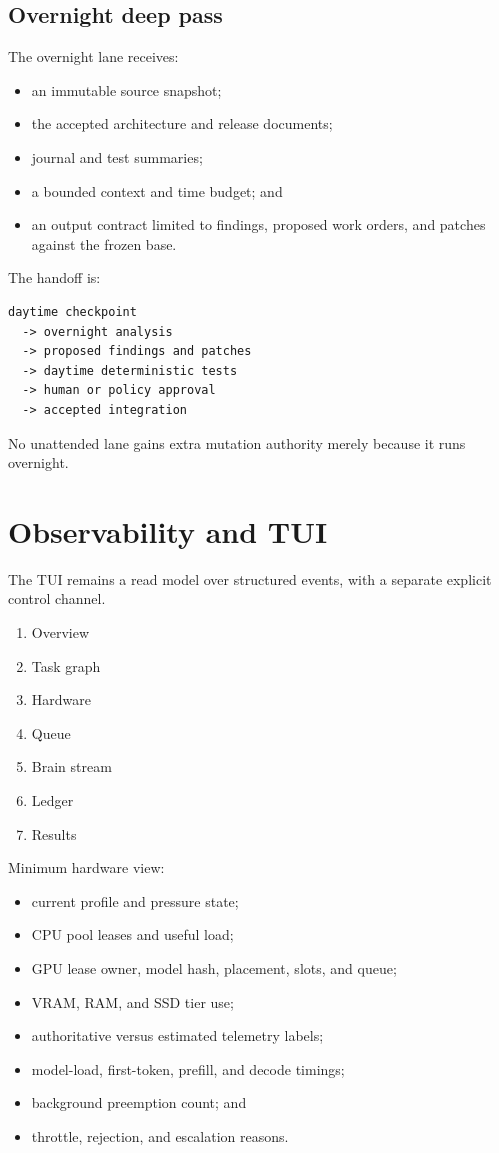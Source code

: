 \documentclass[11pt,letterpaper]{article}
\begin{document}
\subsection{Overnight deep pass}

The overnight lane receives:

\begin{itemize}
  \item an immutable source snapshot;
  \item the accepted architecture and release documents;
  \item journal and test summaries;
  \item a bounded context and time budget; and
  \item an output contract limited to findings, proposed work orders, and
        patches against the frozen base.
\end{itemize}

The handoff is:

\begin{lstlisting}
daytime checkpoint
  -> overnight analysis
  -> proposed findings and patches
  -> daytime deterministic tests
  -> human or policy approval
  -> accepted integration
\end{lstlisting}

No unattended lane gains extra mutation authority merely because it runs
overnight.

\section{Observability and TUI}

The TUI remains a read model over structured events, with a separate explicit
control channel.

\begin{enumerate}
  \item Overview
  \item Task graph
  \item Hardware
  \item Queue
  \item Brain stream
  \item Ledger
  \item Results
\end{enumerate}

Minimum hardware view:

\begin{itemize}
  \item current profile and pressure state;
  \item CPU pool leases and useful load;
  \item GPU lease owner, model hash, placement, slots, and queue;
  \item VRAM, RAM, and SSD tier use;
  \item authoritative versus estimated telemetry labels;
  \item model-load, first-token, prefill, and decode timings;
  \item background preemption count; and
  \item throttle, rejection, and escalation reasons.
\end{itemize}
\end{document}

